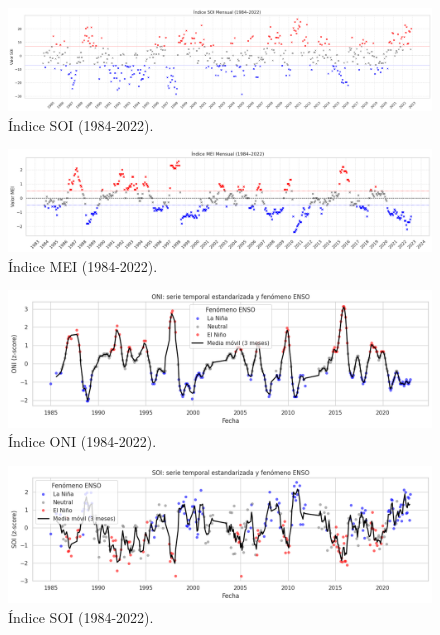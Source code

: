 \begin{figure}[ht]
        \centering
        \includegraphics[scale=.26]
        {Figures/fig14_soi.png}
        \caption{Índice SOI (1984-2022).}
        \label{fig:indice_soi}
\end{figure}

\begin{figure}[ht]
        \centering
        \includegraphics[scale=.32]
        {Figures/fig15_mei.png}
        \caption{Índice MEI (1984-2022).}
        \label{fig:indice_mei}
\end{figure}

\begin{figure}[ht]
        \centering
        \includegraphics[scale=.45]
        {Figures/fig17_ts_oni.png}
        \caption{Índice ONI (1984-2022).}
        \label{fig:indice_oni_ts}
\end{figure}

\begin{figure}[ht]
        \centering
        \includegraphics[scale=.45]
        {Figures/fig18_ts_soi.png}
        \caption{Índice SOI (1984-2022).}
        \label{fig:indice_soi_ts}
\end{figure}


